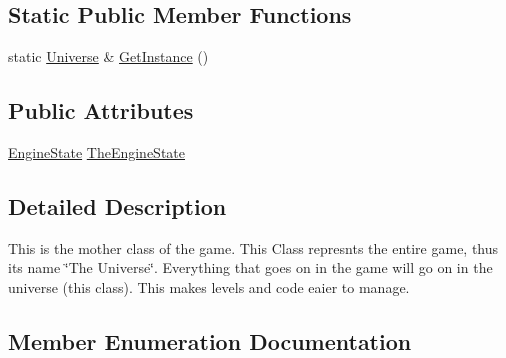 \subsection*{Static Public Member Functions}
\begin{DoxyCompactItemize}
\item 
static \hyperlink{classUniverse}{Universe} \& \hyperlink{classUniverse_a7a9e1c0df0fea192e0ead1fbd3e35d1e}{Get\+Instance} ()
\end{DoxyCompactItemize}
\subsection*{Public Attributes}
\begin{DoxyCompactItemize}
\item 
\hyperlink{classUniverse_a9a3907e0a49d7e91098163238ef50505}{Engine\+State} \hyperlink{classUniverse_a8da2dd7a1c2bb9b7e0447e06ef61df5c}{The\+Engine\+State}
\end{DoxyCompactItemize}


\subsection{Detailed Description}
This is the mother class of the game. This Class represnts the entire game, thus its name \char`\"{}\+The Universe\char`\"{}. Everything that goes on in the game will go on in the universe (this class). This makes levels and code eaier to manage. 

\subsection{Member Enumeration Documentation}
\hypertarget{classUniverse_a9a3907e0a49d7e91098163238ef50505}{}
